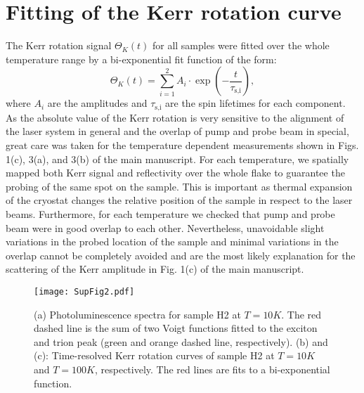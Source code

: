 \documentclass[prb,aps,superscriptaddress,reprint,floatfix]{revtex4-1}
\begin{document}
\section{Fitting of the Kerr rotation curve}

The Kerr rotation signal $\Theta_{K}(t)$ for all samples were fitted over the whole temperature range by a bi-exponential fit function of the form:
\begin{equation}
\Theta_{K}(t) =\sum_{i=1}^2 A_i \cdot \exp \left( -\frac{t}{\tau_\text{s,i}} \right),
\label{eq:Fit}
\end{equation}
where $A_{i}$ are the amplitudes and $\tau_\text{s,i}$ are the spin lifetimes for each component. As the absolute value of the Kerr rotation is very sensitive to the alignment of the laser system in general and the overlap of pump and probe beam in special, great care was taken for the temperature dependent measurements shown in Figs. 1(c), 3(a), and 3(b) of the main manuscript. For each temperature, we spatially mapped both Kerr signal and reflectivity over the whole flake to guarantee the probing of the same spot on the sample. This is important as thermal expansion of the cryostat changes the relative position of the sample in respect to the laser beams. Furthermore, for each temperature we checked that pump and probe beam were in good overlap to each other. Nevertheless, unavoidable slight variations in the probed location of the sample and minimal variations in the overlap cannot be completely avoided and are the most likely explanation for the scattering of the Kerr amplitude in Fig. 1(c) of the main manuscript.
  
\begin{figure*}[t]
	\texttt{[image: SupFig2.pdf]}
\caption{(a) Photoluminescence spectra for sample H2 at $T=\unit{10}{K}$. The red dashed line is the sum of two Voigt functions fitted to the exciton and trion peak (green and orange dashed line, respectively). (b) and (c): Time-resolved Kerr rotation curves of sample H2 at $T=\unit{10}{K}$ and $T=\unit{100}{K}$, respectively. The red lines are fits to a bi-exponential function.}
\label{SupFig3}

\end{figure*}
\end{document}
